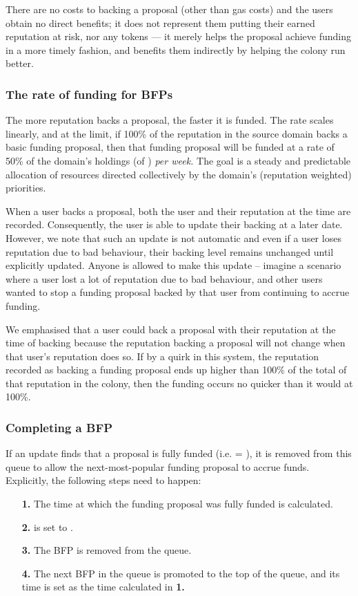 There are no costs to backing a proposal (other than gas costs) and the users obtain no direct benefits; it does not represent them putting their earned reputation at risk, nor any tokens --- it merely helps the proposal achieve funding in a more timely fashion, and benefits them indirectly by helping the colony run better.

\subsubsection*{The rate of funding for BFPs}
The more reputation backs a proposal, the faster it is funded. The rate scales linearly, and at the limit, if 100\% of the reputation in the source domain backs a basic funding proposal, then that funding proposal will be funded at a rate of 50\% of the domain's holdings (of ) \textit{per week.} The goal is a steady and predictable allocation of resources directed collectively by the domain's (reputation weighted) priorities.

When a user backs a proposal, both the user and their reputation at the time are recorded. Consequently, the user is able to update their backing at a later date. However, we note that such an update is not automatic and even if a user loses reputation due to bad behaviour, their backing level remains unchanged until explicitly updated. Anyone is allowed to make this update -- imagine a scenario where a user lost a lot of reputation due to bad behaviour, and other users wanted to stop a funding proposal backed by that user from continuing to accrue funding.

We emphasised that a user could back a proposal with their reputation at the time of backing because the reputation backing a proposal will not change when that user's reputation does so. If by a quirk in this system, the reputation recorded as backing a funding proposal ends up higher than 100\% of the total of that reputation in the colony, then the funding occurs no quicker than it would at 100\%.

\subsubsection*{Completing a BFP}
If an update finds that a proposal is fully funded (i.e.  = ), it is removed from this queue to allow the next-most-popular funding proposal to accrue funds. Explicitly, the following steps need to happen:
\begin{itemize}
 \item[\textbf{1.}] The time at which the funding proposal was fully funded is calculated.%
 \item[\textbf{2.}]  is set to .
 \item[\textbf{3.}] The BFP is removed from the queue.
 \item[\textbf{4.}] The next BFP in the queue is promoted to the top of the queue, and its  time is set as the time calculated in \textbf{1.}
\end{itemize}

